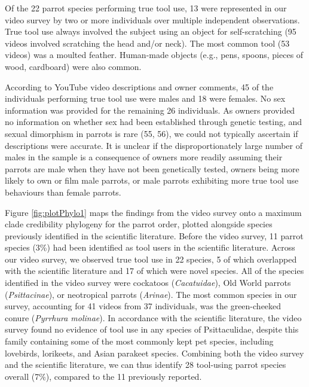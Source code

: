 \documentclass[
  man, donotrepeattitle,floatsintext]{apa6}
\begin{document}
Of the 22
parrot species performing true tool use,
13
were represented in our video survey by two or more individuals over multiple
independent observations. True tool use always involved the subject using an
object for self-scratching (95
videos involved scratching the head and/or neck). The most common tool (53
videos) was a moulted feather. Human-made objects (e.g., pens, spoons, pieces of
wood, cardboard) were also common.

According to YouTube video descriptions and owner comments,
45
of the individuals performing true tool use were males and
18
were females. No sex information was provided for the remaining
26
individuals. As owners provided no information on whether sex had been
established through genetic testing, and sexual dimorphism in parrots is
rare (55, 56), we could not typically ascertain if descriptions
were accurate. It is unclear if the disproportionately large number of males in
the sample is a consequence of owners more readily assuming their parrots are
male when they have not been genetically tested, owners being more likely to own
or film male parrots, or male parrots exhibiting more true tool use behaviours
than female parrots.

Figure \ref{fig:plotPhylo1} maps the findings from the video survey onto a
maximum clade credibility phylogeny for the parrot order, plotted alongside
species previously identified in the scientific literature. Before the video
survey, 11 parrot species (3\%) had been identified as tool users in the
scientific literature. Across our video survey, we observed true tool use in
22
species, 5 of which overlapped with the scientific literature and
17
of which were novel species. All of the species identified in the video survey
were cockatoos (\emph{Cacatuidae}), Old World parrots (\emph{Psittacinae}), or neotropical
parrots (\emph{Arinae}). The most common species in our survey, accounting for
41 videos from
37
individuals, was the green-cheeked conure (\emph{Pyrrhura molinae}). In accordance
with the scientific literature, the video survey found no evidence of tool use
in any species of Psittaculidae, despite this family containing some of the most
commonly kept pet species, including lovebirds, lorikeets, and Asian parakeet
species. Combining both the video survey and the scientific literature, we can
thus identify 28 tool-using parrot species overall (7\%), compared to the 11
previously reported.
\end{document}
